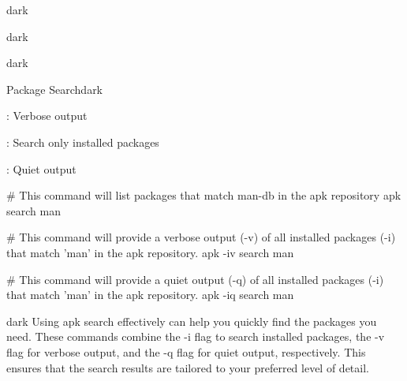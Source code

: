 \begin{baseBoxThree}{}{dark}
    \smallskip
    \begin{baseBoxThree}{}{dark}
        \begin{posnex}
        \end{posnex}
    \end{baseBoxThree}
    \smallskip
\end{baseBoxThree}

\begin{baseBoxThree}{}{dark}
    \smallskip
    \begin{baseBoxThree}{Package Search}{dark}
        \smallskip
        \begin{posnexItemize}
            \item[\sA] : Verbose output
            \item[\sA] : Search only installed packages
            \item[\sA] : Quiet output
        \end{posnexItemize}
        \begin{posnex}
# This command will list packages that match man-db in the apk repository
apk search man

# This command will provide a verbose output (-v) of all installed packages (-i) that match 'man' in the apk repository.
apk -iv search man

# This command will provide a quiet output (-q) of all installed packages (-i) that match 'man' in the apk repository.
apk -iq search man
            \end{posnex}
        \begin{baseBoxThree}{}{dark}
            Using apk search effectively can help you quickly find the packages you need.
            These commands combine the -i flag to search installed packages, the -v flag for verbose output, and the -q flag for quiet output, respectively. This ensures that the search results are tailored to your preferred level of detail.
        \end{baseBoxThree}
        \smallskip
    \end{baseBoxThree}
    \smallskip
\end{baseBoxThree}



